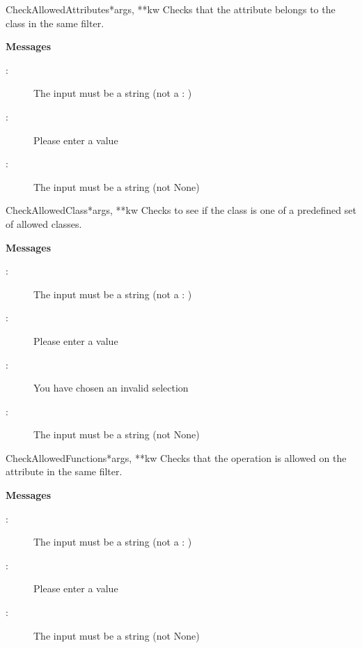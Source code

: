 \documentclass[letterpaper,10pt,english]{manual}
\begin{document}
\hypertarget{webscavator.forms.validators.CheckAllowedAttributes}{}\begin{classdesc}{CheckAllowedAttributes}{*args, **kw}
Checks that the attribute belongs to the class in the same filter.

\textbf{Messages}
\begin{description}
\item[:]
The input must be a string (not a : )

\item[:]
Please enter a value

\item[:]
The input must be a string (not None)

\end{description}
\end{classdesc}

\hypertarget{webscavator.forms.validators.CheckAllowedClass}{}\begin{classdesc}{CheckAllowedClass}{*args, **kw}
Checks to see if the class is one of a predefined set of allowed classes.

\textbf{Messages}
\begin{description}
\item[:]
The input must be a string (not a : )

\item[:]
Please enter a value

\item[:]
You have chosen an invalid selection

\item[:]
The input must be a string (not None)

\end{description}
\end{classdesc}

\hypertarget{webscavator.forms.validators.CheckAllowedFunctions}{}\begin{classdesc}{CheckAllowedFunctions}{*args, **kw}
Checks that the operation is allowed on the attribute in the same filter.

\textbf{Messages}
\begin{description}
\item[:]
The input must be a string (not a : )

\item[:]
Please enter a value

\item[:]
The input must be a string (not None)

\end{description}
\end{classdesc}
\end{document}
